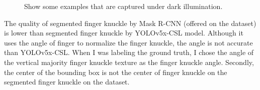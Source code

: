 \begin{figure}[h]
    \centering

    \caption{Show some examples that are captured under dark illumination.}
    \label{dark-subjects}
\end{figure}

The quality of segmented finger knuckle by Mask R-CNN (offered on the dataset) is lower than segmented finger knuckle by YOLOv5x-CSL model. Although it uses the angle of finger to normalize the finger knuckle, the angle is not accurate than YOLOv5x-CSL. When I was labeling the ground truth, I chose the angle of the vertical majority finger knuckle texture as the finger knuckle angle. Secondly, the center of the bounding box is not the center of finger knuckle on the segmented finger knuckle on the dataset.

